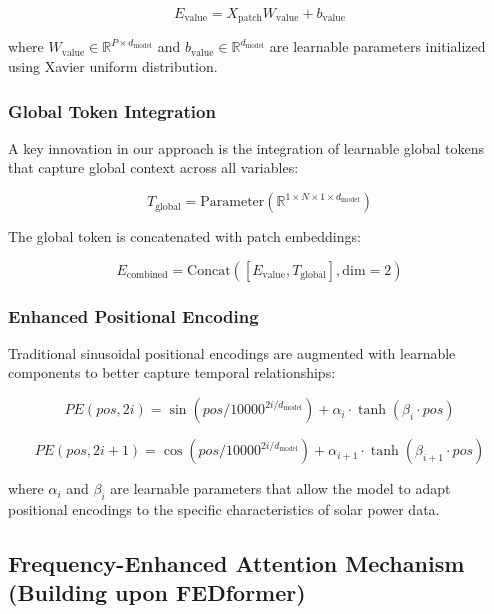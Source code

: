 \documentclass[12pt]{uomthesis}
\begin{document}
\begin{equation}
E_{\text{value}} = X_{\text{patch}} W_{\text{value}} + b_{\text{value}}
\end{equation}

where $W_{\text{value}} \in \mathbb{R}^{P \times d_{\text{model}}}$ and $b_{\text{value}} \in \mathbb{R}^{d_{\text{model}}}$ are learnable parameters initialized using Xavier uniform distribution.

\subsubsection{Global Token Integration}

A key innovation in our approach is the integration of learnable global tokens that capture global context across all variables:

\begin{equation}
T_{\text{global}} = \text{Parameter}(\mathbb{R}^{1 \times N \times 1 \times d_{\text{model}}})
\end{equation}

The global token is concatenated with patch embeddings:

\begin{equation}
E_{\text{combined}} = \text{Concat}([E_{\text{value}}, T_{\text{global}}], \text{dim}=2)
\end{equation}

\subsubsection{Enhanced Positional Encoding}

Traditional sinusoidal positional encodings are augmented with learnable components to better capture temporal relationships:

\begin{equation}
PE(pos, 2i) = \sin(pos / 10000^{2i/d_{\text{model}}}) + \alpha_i \cdot \tanh(\beta_i \cdot pos)
\end{equation}

\begin{equation}
PE(pos, 2i+1) = \cos(pos / 10000^{2i/d_{\text{model}}}) + \alpha_{i+1} \cdot \tanh(\beta_{i+1} \cdot pos)
\end{equation}

where $\alpha_i$ and $\beta_i$ are learnable parameters that allow the model to adapt positional encodings to the specific characteristics of solar power data.

\subsection{Frequency-Enhanced Attention Mechanism (Building upon FEDformer)}
\end{document}
